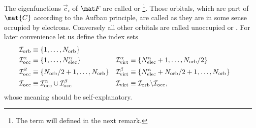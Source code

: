 \begin{rem}
The eigenfunctions $\vec{c}_i$ of $\matF$ are called 
or %
\footnote{The term \SCF will defined in the next remark.}.
Those orbitals, which are part of $\mat{C}$ according to the Aufbau principle,
are called 
as they are in some sense occupied by electrons.
Conversely all other orbitals are called unoccupied or .
For later convenience let us define the index sets
\begin{align*}
	\mathcal{I}_\text{orb} &\equiv \{1, \ldots, N_\text{orb} \} \\
	\mathcal{I}_\text{occ}^\alpha &\equiv \{1, \ldots, N_\text{elec}^\alpha \} &
		\mathcal{I}_\text{virt}^\alpha &\equiv \{N_\text{elec}^\alpha + 1, \ldots, N_\text{orb}/2 \} \\
	\mathcal{I}_\text{occ}^\beta &\equiv \{N_\text{orb}/2 + 1, \ldots, N_\text{orb} \} &
		\mathcal{I}_\text{virt}^\beta &\equiv \{N_\text{elec}^\alpha + N_\text{orb}/2 + 1, \ldots, N_\text{orb} \} \\
	\mathcal{I}_\text{occ} &\equiv  \mathcal{I}_\text{occ}^\alpha \cup \mathcal{I}_\text{occ}^\beta &
		\mathcal{I}_\text{virt} &\equiv  \mathcal{I}_\text{orb} \backslash \mathcal{I}_\text{occ},
\end{align*}
whose meaning should be self-explanatory.
\end{rem}

